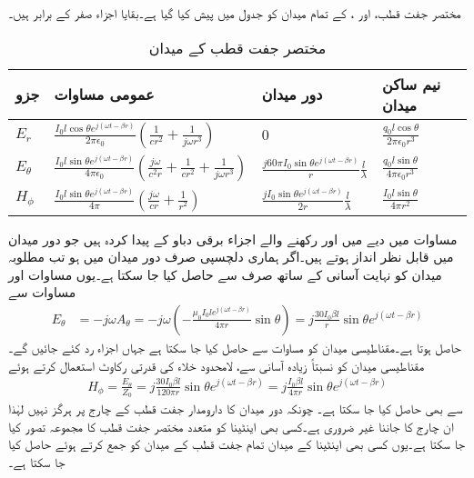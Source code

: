 مختصر جفت قطب،  اور ، کے تمام میدان کو جدول  میں پیش کیا گیا ہے۔بقایا اجزاء  صفر  کے برابر ہیں۔
\begin{table}
\caption{مختصر جفت قطب کے میدان}
\centering
\begin{tabular}{l l l l}
\hline
جزو & عمومی مساوات & دور میدان & نیم ساکن میدان\\
\hline 
\rule{0pt}{2em}
$E_r$ &$\frac{I_0 l \cos \theta e^{j(\omega t -\beta r)}}{2\pi \epsilon_0}\left(\frac{1}{c r^2}+\frac{1}{j \omega r^3} \right)$&$0$&$\frac{q_0 l \cos \theta}{2\pi \epsilon_0 r^3}$ \\[4ex]
$E_{\theta}$&$\frac{I_0 l \sin \theta e^{j(\omega t -\beta r)}}{4\pi \epsilon_0}\left(\frac{j \omega}{c^2 r}+\frac{1}{c r^2}+\frac{1}{j \omega r^3} \right)$&$ \frac{j 60 \pi I_0 \sin \theta e^{j(\omega t-\beta r)}}{r} \frac{l}{\lambda}$& $\frac{q_0 l \sin \theta }{4\pi \epsilon_0 r^3}$\\ [4ex]
$H_{\phi}$&$\frac{I_0 l \sin \theta e^{j(\omega t -\beta r)}}{4\pi} \left(\frac{j \omega}{c r}+\frac{1}{r^2} \right)$&$\frac{j I_0 \sin \theta e^{j(\omega t -\beta r)}}{2r}\frac{l}{\lambda}  $& $\frac{I_0 l \sin \theta }{4\pi r^2} $
\end{tabular}
\label{جدول_اینٹینا_مختصر_جفت_قطب}
\end{table}


مساوات  میں دیے   میں  اور  رکھنے والے اجزاء برقی دباو  کے پیدا کردہ ہیں جو دور میدان میں قابل نظر انداز ہوتے ہیں۔اگر ہماری دلچسپی صرف دور میدان میں ہو تب مطلوبہ میدان کو نہایت آسانی کے ساتھ صرف  سے حاصل کیا جا سکتا ہے۔یوں مساوات  اور مساوات  سے
\begin{align}\label{مساوات_اینٹینا_دور_میدان_برقی_رو_سے_حصول}
E_{\theta}&=-j \omega A_{\theta}=-j \omega \left(-\frac{ \mu_0 I_0 l e^{j(\omega t -\beta r)}}{4\pi r} \sin \theta \right)=j \frac{30 I_0 \beta l}{r} \sin \theta e^{j(\omega t-\beta r)}
\end{align}
حاصل ہوتا ہے۔مقناطیسی میدان  کو مساوات  سے حاصل کیا جا سکتا ہے  جہاں  اجزاء رد کئے جائیں گے۔مقناطیسی میدان  کو نسبتاً زیادہ آسانی سے، لامحدود خلاء کی قدرتی رکاوٹ  استعمال کرتے ہوئے
\begin{align}
H_{\phi}=\frac{E_{\theta}}{Z_0}=j \frac{30 I_0 \beta l}{120 \pi r} \sin \theta e^{j(\omega t-\beta r)}=j \frac{ I_0 \beta l}{4 \pi r} \sin \theta e^{j(\omega t-\beta r)}
\end{align}
سے بھی  حاصل کیا جا سکتا ہے۔ چونکہ دور میدان کا دارومدار جفت قطب کے چارج  پر ہرگز نہیں لہٰذا ان چارج کا جاننا غیر ضروری ہے۔کسی بھی اینٹینا کو متعدد مختصر جفت قطب کا مجموعہ تصور کیا جا سکتا ہے۔یوں کسی بھی اینٹینا کے میدان تمام جفت قطب کے میدان کو جمع کرتے ہوئے حاصل کیا جا سکتا ہے۔   


